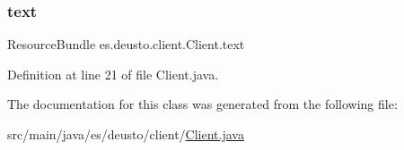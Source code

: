 \subsubsection{\texorpdfstring{text}{text}}
{\footnotesize\ttfamily Resource\+Bundle es.\+deusto.\+client.\+Client.\+text}



Definition at line 21 of file Client.\+java.



The documentation for this class was generated from the following file\+:\begin{DoxyCompactItemize}
\item 
src/main/java/es/deusto/client/\mbox{\hyperlink{_client_8java}{Client.\+java}}\end{DoxyCompactItemize}
